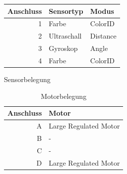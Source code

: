 \documentclass[
	12pt,
	colorbacktitle,
	accentcolor=tud1c,
	german,
	article
]{tuddesign/tudreport}
\begin{document}
		\begin{minipage}[b]{.45\textwidth}\centering
					\begin{tabular}{r|l|l}						
						\textbf{Anschluss} & \textbf{Sensortyp} & \textbf{Modus} \\ \hline
						1 & Farbe & ColorID \\ 
						2 & Ultraschall & Distance \\ 
						3 & Gyroskop & Angle \\ 
						4 & Farbe & ColorID \\ 
					\end{tabular}
				\caption{Sensorbelegung}
				\label{tab:sensors}
		\end{minipage}
		\hfill
		\begin{minipage}{.45\textwidth}
			\begin{table}[htbp]
					\begin{tabular}{r|l}						
						\textbf{Anschluss} & \textbf{Motor} \\ \hline
						A & Large Regulated Motor \\ 
						B & - \\ 
						C & - \\ 
						D & Large Regulated Motor \\ 
					\end{tabular}
				\caption{Motorbelegung}
				\label{tab:motors}
			\end{table}
			
		\end{minipage}
	

				
	
\end{document}
